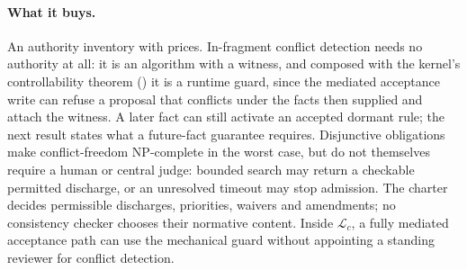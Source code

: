 \documentclass[11pt,a4paper]{article}
\theoremstyle{definition}
\theoremstyle{definition}
\theoremstyle{remark}
\begin{document}
\paragraph{What it buys.} An authority inventory with prices. In-fragment
conflict detection needs no authority at all: it is an algorithm with a witness,
and composed with the kernel's controllability theorem
() it is a runtime guard, since the
mediated acceptance write can refuse a proposal that conflicts under the facts
then supplied and attach the witness. A later fact can still activate an
accepted dormant rule; the next result states what a future-fact guarantee
requires. Disjunctive obligations make conflict-freedom NP-complete in the
worst case, but do not themselves require a human or central judge: bounded
search may return a checkable permitted discharge, or an unresolved timeout
may stop admission. The charter decides permissible discharges, priorities,
waivers and amendments; no consistency checker chooses their normative
content. Inside $\mathcal{L}_c$, a fully mediated acceptance path can use the
mechanical guard without appointing a standing reviewer for conflict detection.
\end{document}
